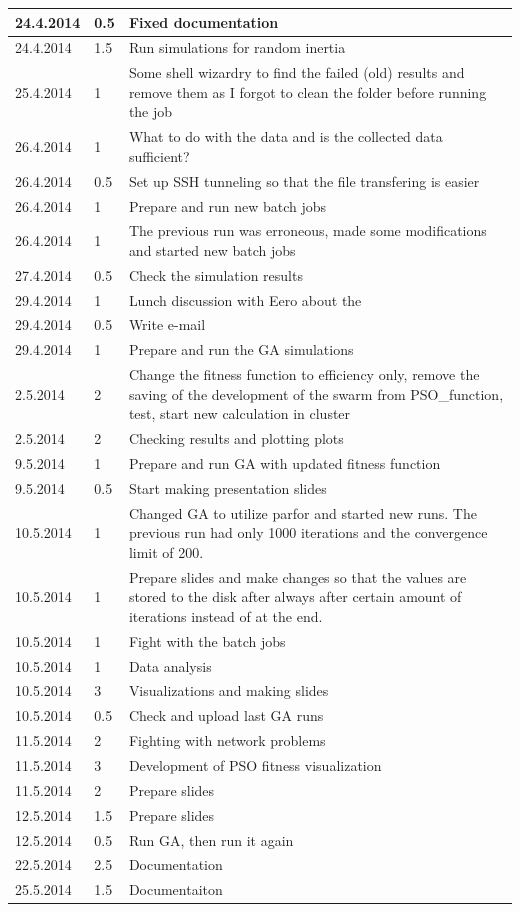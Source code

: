\documentclass[twoside]{article}
\begin{document}
\begin{longtable}{ | l | l | p{10cm} | }
	24.4.2014 & 0.5 & Fixed documentation \\ \hline
	24.4.2014 & 1.5 & Run simulations for random inertia \\ \hline
	25.4.2014 & 1 & Some shell wizardry to find the failed (old) results and remove them as I forgot to clean the folder before running the job \\ \hline
	26.4.2014 & 1 & What to do with the data and is the collected data sufficient? \\ \hline
	26.4.2014 & 0.5 & Set up SSH tunneling so that the file transfering is easier \\ \hline
	26.4.2014 & 1 & Prepare and run new batch jobs \\ \hline
	26.4.2014 & 1 & The previous run was erroneous, made some modifications and started new batch jobs \\ \hline
	27.4.2014 & 0.5 & Check the simulation results \\ \hline
	29.4.2014 & 1 & Lunch discussion with Eero about the \\ \hline
	29.4.2014 & 0.5 & Write e-mail \\ \hline
	29.4.2014 & 1 & Prepare and run the GA simulations \\ \hline
	2.5.2014 & 2 & Change the fitness function to efficiency only, remove the saving of the development of the swarm from PSO\_function, test, start new calculation in cluster \\ \hline
	2.5.2014 & 2 & Checking results and plotting plots \\ \hline
	9.5.2014 & 1 & Prepare and run GA with updated fitness function \\ \hline
	9.5.2014 & 0.5 & Start making presentation slides \\ \hline
	10.5.2014 & 1 & Changed GA to utilize parfor and started new runs. The previous run had only 1000 iterations and the convergence limit of 200. \\ \hline
	10.5.2014 & 1 & Prepare slides and make changes so that the values are stored to the disk after always after certain amount of iterations instead of at the end. \\ \hline
	10.5.2014 & 1 & Fight with the batch jobs \\ \hline
	10.5.2014 & 1 & Data analysis \\ \hline
	10.5.2014 & 3 & Visualizations and making slides \\ \hline
	10.5.2014 & 0.5 & Check and upload last GA runs \\ \hline
	11.5.2014 & 2 & Fighting with network problems \\ \hline
	11.5.2014 & 3 & Development of PSO fitness visualization \\ \hline
	11.5.2014 & 2 & Prepare slides \\ \hline
	12.5.2014 & 1.5 & Prepare slides \\ \hline
	12.5.2014 & 0.5 & Run GA, then run it again \\ \hline
	22.5.2014 & 2.5 & Documentation \\ \hline
	25.5.2014 & 1.5 & Documentaiton \\ \hline
	


\end{longtable}
\end{document}
